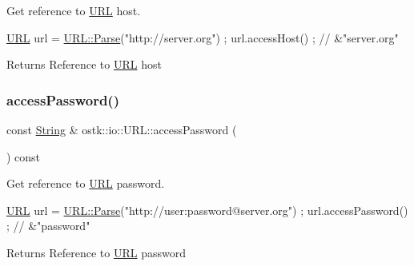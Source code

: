 Get reference to \hyperlink{classostk_1_1io_1_1_u_r_l}{U\+RL} host. 


\begin{DoxyCode}
\hyperlink{classostk_1_1io_1_1_u_r_l_a2537e046cef4ac966cc295abb81279c2}{URL} url = \hyperlink{classostk_1_1io_1_1_u_r_l_a1cd7216bb1079f62386a218ba510958d}{URL::Parse}(\textcolor{stringliteral}{"http://server.org"}) ;
url.accessHost() ; \textcolor{comment}{// &"server.org"}
\end{DoxyCode}


\begin{DoxyReturn}{Returns}
Reference to \hyperlink{classostk_1_1io_1_1_u_r_l}{U\+RL} host 
\end{DoxyReturn}
\mbox{\label{classostk_1_1io_1_1_u_r_l_a7b61c488b9b1781cf1783cee04cd61e6}} 
\subsubsection{\texorpdfstring{access\+Password()}{accessPassword()}}
{\footnotesize\ttfamily const \hyperlink{namespaceostk_1_1io_a95d49b120613a7610cb1b4f03b1116b6}{String} \& ostk\+::io\+::\+U\+R\+L\+::access\+Password (\begin{DoxyParamCaption}{ }\end{DoxyParamCaption}) const}



Get reference to \hyperlink{classostk_1_1io_1_1_u_r_l}{U\+RL} password. 


\begin{DoxyCode}
\hyperlink{classostk_1_1io_1_1_u_r_l_a2537e046cef4ac966cc295abb81279c2}{URL} url = \hyperlink{classostk_1_1io_1_1_u_r_l_a1cd7216bb1079f62386a218ba510958d}{URL::Parse}(\textcolor{stringliteral}{"http://user:password@server.org"}) ;
url.accessPassword() ; \textcolor{comment}{// &"password"}
\end{DoxyCode}


\begin{DoxyReturn}{Returns}
Reference to \hyperlink{classostk_1_1io_1_1_u_r_l}{U\+RL} password 
\end{DoxyReturn}
\mbox{\label{classostk_1_1io_1_1_u_r_l_a94b5966da7e3d32068f87c33ca78828e}} 
